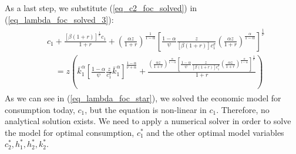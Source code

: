 \documentclass[a4paper, 12pt]{article}
\begin{document}
\begin{Answer}
\begin{align}
\begin{split}
			\end{split}
		 \end{align}
		 As a last step, we substitute (\ref{eq_c2_foc_solved}) in (\ref{eq_lambda_foc_solved_3}):
		 \begin{align}
			\begin{split}
				& c_1 + \frac{\left[\beta \left(1+r\right)\right]^{\frac{1}{\sigma}} c_1}{1+r} + \left(\frac{\alpha z}{1+r}\right)^{\frac{1}{1-\alpha}} \left[\frac{1-\alpha}{\psi}\frac{z}{\left[\beta \left(1+r\right)\right] c_1^\sigma}\left(\frac{\alpha z}{1+r}\right)^{\frac{\alpha}{1-\alpha}} \right]^{\frac{1}{\nu}}\\
				& \quad = z \left(\bar{k}_1^\alpha \left[\frac{1-\alpha}{\psi} \frac{z}{c_1^\sigma} \bar{k}_1^\alpha\right]^{\frac{1-\alpha}{\nu+\alpha}} + \frac{\left(\frac{\alpha z}{1+r}\right)^{\frac{\alpha}{1-\alpha}} \left[\frac{1-\alpha}{\psi}\frac{z}{\left[\beta \left(1+r\right)\right] c_1^\sigma}\left(\frac{\alpha z}{1+r}\right)^{\frac{\alpha}{1-\alpha}} \right]^{\frac{1}{\nu}}}{1+r} \right)\label{eq_lambda_foc_star}
			\end{split}
		 \end{align}
		 As we can see in (\ref{eq_lambda_foc_star}), we solved the economic model for consumption today, $c_1$, but the equation is non-linear in $c_1$. Therefore, no analytical solution exists. We need to apply a numerical solver in order to solve the model for optimal consumption, $c_1^*$ and the other optimal model variables $c_2^*,h_1^*,h_2^*,k_2^*$.
\end{Answer}%
\end{document}
